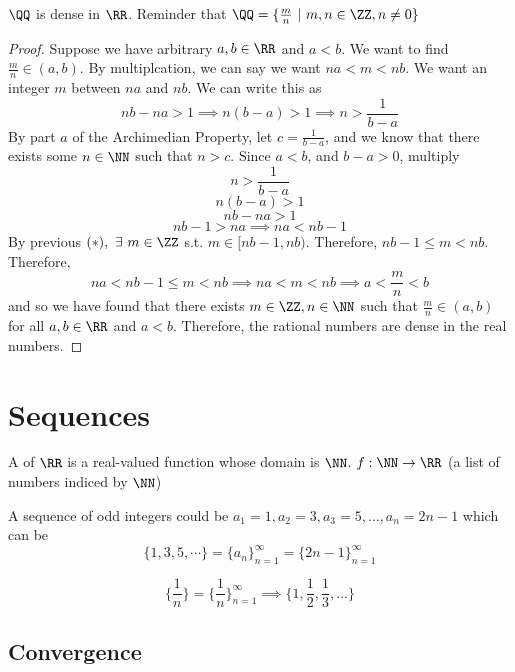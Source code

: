 \documentclass[12pt]{scrartcl}
\begin{document}
\begin{theorem}
  $\QQ$ is dense in $\RR$. Reminder that $\QQ = \{\frac{m}{n} \ | \ m, n \in \ZZ, n \neq 0\}$

  \begin{proof}
    Suppose we have arbitrary $a, b \in \RR$ and $a < b$. We want to find $\frac{m}{n} \in (a, b)$. 
    By multiplcation, we can say we want $na < m < nb$. We want an integer $m$ between
    $na$ and $nb$. We can write this as 
    \[nb - na > 1 \implies n(b-a) > 1 \implies n > \frac{1}{b-a}\]
    By part $a$ of the Archimedian Property, let $c = \frac{1}{b-a}$, and we know that 
    there exists some $n \in \NN$ such that $n > c$. Since $a < b$, and $b - a > 0$, 
    multiply
    \[n > \frac{1}{b-a}\]
    \[n(b-a) > 1\]
    \[nb - na > 1\]
    \[nb - 1 > na \implies na < nb - 1\]
    By previous $(*), \ \exists \ m \in \ZZ$ s.t. $m \in [nb-1, nb)$. Therefore, 
    $nb - 1 \leq m < nb$. Therefore, 
    \[na < nb - 1 \leq m < nb \implies na < m < nb \implies a < \frac{m}{n} < b\]
    and so we have found that there exists $m \in \ZZ, n \in \NN$ such that $\frac{m}{n} \in (a, b)$ 
    for all $a, b \in \RR$ and $a < b$. Therefore, the rational numbers are dense in the real numbers. 
  \end{proof}
\end{theorem}

\section{Sequences}

\begin{definition}
  A  of $\RR$ is a real-valued function whose domain is $\NN$. 
  $f: \NN \rightarrow \RR$ (a list of numbers indiced by $\NN$)
\end{definition}

\begin{example}
  A sequence of odd integers could be $a_1 = 1, a_2 = 3, a_3 = 5, \ldots, a_n = 2n-1$
  which can be 
  \[\{1, 3, 5, \cdots\} = \{a_n \}_{n=1}^\infty = \{2n-1\}_{n=1}^\infty\]
\end{example}

\begin{example}
  \[\{\frac{1}{n}\} = \{\frac{1}{n}\}_{n=1}^\infty \implies \{1, \frac{1}{2}, \frac{1}{3}, \ldots\}\]
\end{example}

\subsection{Convergence}
\end{document}

